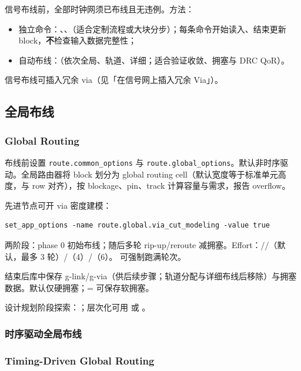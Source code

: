 信号布线前，全部时钟网须已布线且无违例。方法：
\begin{itemize}
  \item 独立命令：、、（适合定制流程或大块分步）；每条命令开始读入、结束更新 block，\textbf{不}检查输入数据完整性；
  \item 自动布线：（依次全局、轨道、详细；适合验证收敛、拥塞与 DRC QoR）。
\end{itemize}

信号布线可插入冗余 via（见「在信号网上插入冗余 Via」）。

\subsection{全局布线}
\subsubsection*{Global Routing}

布线前设置 \texttt{route.common\_options} 与 \texttt{route.global\_options}。默认非时序驱动。全局路由器将 block 划分为 global routing cell（默认宽度等于标准单元高度，与 row 对齐），按 blockage、pin、track 计算容量与需求，报告 overflow。

先进节点可开 via 密度建模：
\begin{lstlisting}
set_app_options -name route.global.via_cut_modeling -value true
\end{lstlisting}

两阶段：phase 0 初始布线；随后多轮 rip-up/reroute 减拥塞。Effort：//（默认，最多 3 轮）/（4）/（6）。 可强制跑满轮次。

结束后库中保存 g-link/g-via（供后续步骤；轨道分配与详细布线后移除）与拥塞数据。默认仅硬拥塞；= 可保存软拥塞。

设计规划阶段探索：；层次化可用  或 。

\subsubsection{时序驱动全局布线}
\subsubsection*{Timing-Driven Global Routing}

